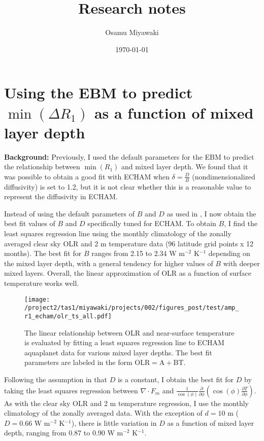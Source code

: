 \documentclass{article}
\title{Research notes}
\date{\today}
\author{Osamu Miyawaki}
\begin{document}
\maketitle

\section{Using the \cite{rose2017} EBM to predict $\min(\Delta R_1)$ as a function of mixed layer depth}
\textbf{Background:} Previously, I used the default parameters for the \cite{rose2017} EBM to predict the relationship between $\min(R_1)$ and mixed layer depth. We found that it was possible to obtain a good fit with ECHAM when $\delta=\frac{D}{B}$ (nondimensionalized diffusivity) is set to 1.2, but it is not clear whether this is a reasonable value to represent the diffusivity in ECHAM.

Instead of using the default parameters of $B$ and $D$ as used in \cite{rose2017}, I now obtain the best fit values of $B$ and $D$ specifically tuned for ECHAM. To obtain $B$, I find the least squares regression line using the monthly climatology of the zonally averaged clear sky OLR and 2 m temperature data (96 latitude grid points x 12 months). The best fit for $B$ ranges from 2.15 to 2.34 W m$^{-2}$ K$^{-1}$ depending on the mixed layer depth, with a general tendency for higher values of $B$ with deeper mixed layers. Overall, the linear approximation of OLR as a function of surface temperature works well.

\begin{figure}
    \texttt{[image: /project2/tas1/miyawaki/projects/002/figures\_post/test/amp\_r1\_echam/olr\_ts\_all.pdf]}
    \caption{The linear relationship between OLR and near-surface temperature is evaluated by fitting a least squares regression line to ECHAM aquaplanet data for various mixed layer depths. The best fit parameters are labeled in the form $\mathrm{OLR = A + BT}$.}
    \label{fig:olr-ts}
\end{figure}

Following the assumption in \cite{rose2017} that $D$ is a constant, I obtain the best fit for $D$ by taking the least squares regression between $\nabla \cdot F_m$ and $\frac{1}{\cos(\phi)} \frac{\partial}{\partial \phi} \left( \cos(\phi) \frac{\partial T}{\partial \phi} \right)$. As with the clear sky OLR and 2 m temperature regression, I use the monthly climatology of the zonally averaged data. With the exception of $d=10$ m ($D=0.66$ W m$^{-2}$ K$^{-1}$), there is little variation in $D$ as a function of mixed layer depth, ranging from 0.87 to 0.90 W m$^{-2}$ K$^{-1}$. 
\end{document}

